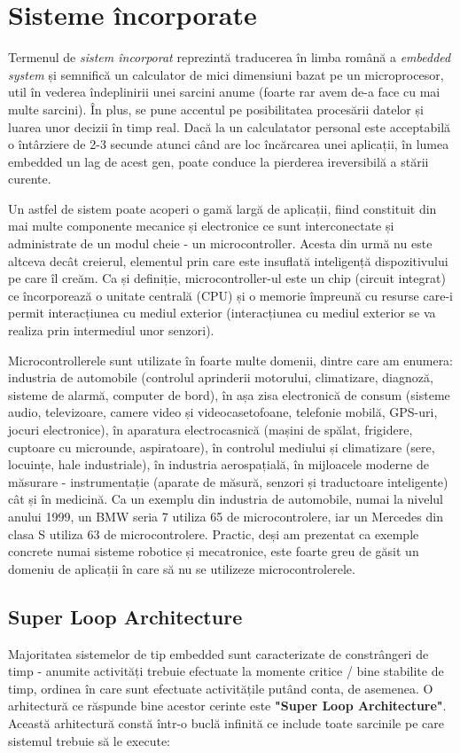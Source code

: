 \chapter{Sisteme încorporate}

Termenul de \textit{sistem încorporat} reprezintă traducerea în limba română a \textit{embedded system} și semnifică un calculator de mici dimensiuni bazat pe un microprocesor, util în vederea îndeplinirii unei sarcini anume (foarte rar avem de-a face cu mai multe sarcini). În plus, se pune accentul pe posibilitatea procesării datelor și luarea unor decizii în timp real. Dacă la un calculatator personal este acceptabilă o întârziere de 2-3 secunde atunci când are loc încărcarea unei aplicații, în lumea embedded un lag de acest gen, poate conduce la pierderea ireversibilă a stării curente.

Un astfel de sistem poate acoperi o gamă largă de aplicații, fiind constituit din mai multe componente mecanice și electronice ce sunt interconectate și administrate de un modul cheie - un microcontroller. Acesta din urmă nu este altceva decât creierul, elementul prin care este insuflată inteligență dispozitivului pe care îl creăm. Ca și definiție, microcontroller-ul este un chip (circuit integrat) ce încorporează o unitate centrală (CPU) și o memorie împreună cu resurse care-i permit interacțiunea cu mediul exterior (interacțiunea cu mediul exterior se va realiza prin intermediul unor senzori).

Microcontrollerele sunt utilizate în foarte multe domenii, dintre care am enumera: industria de automobile (controlul aprinderii motorului, climatizare, diagnoză, sisteme de alarmă, computer de bord), în așa zisa electronică de consum (sisteme audio, televizoare, camere video și videocasetofoane, telefonie mobilă, GPS-uri, jocuri electronice), în aparatura electrocasnică (mașini de spălat, frigidere, cuptoare cu microunde, aspiratoare), în controlul mediului și climatizare (sere, locuințe, hale industriale), în industria aerospațială, în mijloacele moderne de măsurare - instrumentație (aparate de măsură, senzori și traductoare inteligente) cât și în medicină. Ca un exemplu din industria de automobile, numai la nivelul anului 1999, un BMW seria 7 utiliza 65 de microcontrolere, iar un Mercedes din clasa S utiliza 63 de microcontrolere. Practic, deși am prezentat ca exemple concrete numai sisteme robotice și mecatronice, este foarte greu de găsit un domeniu de aplicații în care să nu se utilizeze microcontrolerele.

\section{Super Loop Architecture}
Majoritatea sistemelor de tip embedded sunt caracterizate de constrângeri de timp - anumite activități trebuie efectuate la momente critice / bine stabilite de timp, ordinea în care sunt efectuate activitățile putând conta, de asemenea. O arhitectură ce răspunde bine acestor cerinte este \textbf{"Super Loop Architecture"}.
Această arhitectură constă într-o buclă infinită ce include toate sarcinile pe care sistemul trebuie să le execute:

